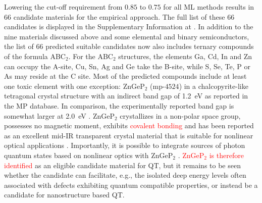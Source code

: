 \documentclass[superscriptaddress,unsortedaddress,
 amsmath,amssymb,
 aps,
]{revtex4-2}
\newcommand{\mrk}[1]{\textcolor{red}{#1}}
\begin{document}
Lowering the cut-off requirement from $0.85$ to $0.75$ for all ML methods results in $66$ candidate materials for the empirical approach.  
The full list of these $66$ candidates is displayed in the Supplementary Information at \cite{supplementary}. 
In addition to the nine materials discussed above and some elemental and binary semiconductors, the list of $66$ predicted suitable candidates now also includes ternary compounds of the formula ABC$_2$. For the ABC$_2$ structures, the elements Ga, Cd, In and Zn can occupy the A-site, Cu, Sn, Ag and Ge take the B-site, while S, Se, Te, P or As may reside at the C site. Most of the predicted compounds include at least one toxic element with one exception: ZnGeP$_2$ (mp-$4524$) in a chalcopyrite-like tetragonal crystal structure with an indirect band gap of \SI{1.2}{\electronvolt} \cite{Zhang2015} as reported in the MP database. In comparison, the experimentally reported band gap is somewhat larger at \SI{2.0}{\electronvolt} \cite{Xing1989}. 
ZnGeP$_2$ crystallizes in a non-polar space group, possesses no magnetic moment, exhibits  \mrk{covalent bonding} and has been reported as an excellent mid-IR transparent crystal material that is suitable for nonlinear optical applications \cite{Zhang2015}. Importantly, it is possible to integrate sources of photon quantum states based on nonlinear optics with ZnGeP$_2$ \cite{Caspani2017}. 
\mrk{ZnGeP$_2$ is therefore identified} as an eligible candidate material for QT, but it remains to be seen whether the candidate can facilitate, e.g., the isolated deep energy levels often associated with defects exhibiting quantum compatible properties, or instead be a candidate for nanostructure based QT.  
\end{document}
